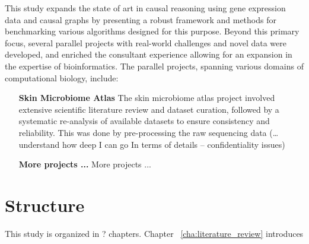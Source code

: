 This study expands the state of art in causal reasoning using gene expression data and causal graphs by presenting a robust framework and methods for benchmarking various algorithms designed for this purpose. Beyond this primary focus, several parallel projects with real-world challenges and novel data were developed, and enriched the consultant experience allowing for an expansion in the expertise of bioinformatics. The parallel projects, spanning various domains of computational biology, include:

\begin{enumerate}
\item[\textbf{Skin Microbiome Atlas}] The skin microbiome atlas project involved extensive scientific literature review and dataset curation, followed by a systematic re-analysis of available datasets to ensure consistency and reliability. This was done by pre-processing the raw sequencing data (…understand how deep I can go In terms of details – confidentiality issues)
\item[\textbf{More projects ...}] More projects ...
\end{enumerate}

\section{Structure} %
\label{sec:structure}

This study is organized in ? chapters. Chapter ~\ref{cha:literature_review} introduces

